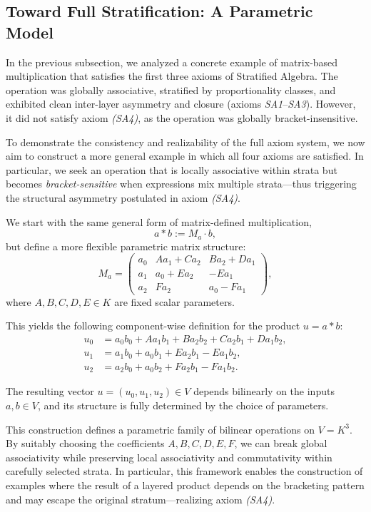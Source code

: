 \documentclass[12pt]{article}
\theoremstyle{definition}
\theoremstyle{plain}
\theoremstyle{remark}
\begin{document}
\subsection{Toward Full Stratification: A Parametric Model}

In the previous subsection, we analyzed a concrete example of matrix-based multiplication that satisfies the first three axioms of Stratified Algebra. The operation was globally associative, stratified by proportionality classes, and exhibited clean inter-layer asymmetry and closure (axioms \emph{SA1}–\emph{SA3}). However, it did not satisfy axiom \emph{(SA4)}, as the operation was globally bracket-insensitive.

To demonstrate the consistency and realizability of the full axiom system, we now aim to construct a more general example in which all four axioms are satisfied. In particular, we seek an operation that is locally associative within strata but becomes \emph{bracket-sensitive} when expressions mix multiple strata—thus triggering the structural asymmetry postulated in axiom \emph{(SA4)}.

We start with the same general form of matrix-defined multiplication,
\[
a * b := M_a \cdot b,
\]
but define a more flexible parametric matrix structure:
\[
M_a =
\begin{pmatrix}
a_0 & A a_1 + C a_2 & B a_2 + D a_1 \\
a_1 & a_0 + E a_2 & -E a_1 \\
a_2 & F a_2 & a_0 - F a_1
\end{pmatrix},
\]
where \( A, B, C, D, E \in K \) are fixed scalar parameters.

This yields the following component-wise definition for the product \( u = a * b \):
\begin{align*}
u_0 &= a_0 b_0 + A a_1 b_1 + B a_2 b_2 + C a_2 b_1 + D a_1 b_2, \\
u_1 &= a_1 b_0 + a_0 b_1 + E a_2 b_1 - E a_1 b_2, \\
u_2 &= a_2 b_0 + a_0 b_2 + F a_2 b_1 - F a_1 b_2.
\end{align*}

The resulting vector \( u = (u_0, u_1, u_2) \in V \) depends bilinearly on the inputs \( a, b \in V \), and its structure is fully determined by the choice of parameters.

This construction defines a parametric family of bilinear operations on \( V = K^3 \). By suitably choosing the coefficients \( A, B, C, D, E, F \), we can break global associativity while preserving local associativity and commutativity within carefully selected strata. In particular, this framework enables the construction of examples where the result of a layered product depends on the bracketing pattern and may escape the original stratum—realizing axiom \emph{(SA4)}.
\end{document}
